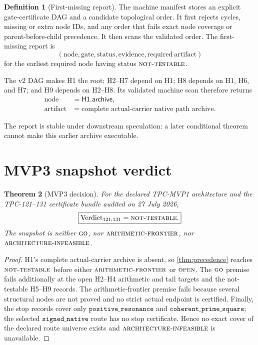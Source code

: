 \documentclass[11pt]{article}
\newtheorem{theorem}{Theorem}[section]
\theoremstyle{definition}
\newtheorem{definition}[theorem]{Definition}
\theoremstyle{remark}
\newcommand{\GO}{\textnormal{\textsc{go}}}
\newcommand{\AINF}{\textnormal{\textsc{architecture-infeasible}}}
\newcommand{\NT}{\textnormal{\textsc{not-testable}}}
\newcommand{\AF}{\textnormal{\textsc{arithmetic-frontier}}}
\newcommand{\OPEN}{\textnormal{\textsc{open}}}
\begin{document}
\begin{definition}[First-missing report]
\label{def:first}
The machine manifest stores an explicit gate-certificate DAG and a
candidate topological order.  It first rejects cycles, missing or
extra node IDs, and any order that fails exact node coverage or
parent-before-child precedence.  It then scans the validated order.
The first-missing report is
\[
 (\mathrm{node},\mathrm{gate},\mathrm{status},
  \mathrm{evidence},\mathrm{required\ artifact})
\]
for the earliest required node having status \(\NT\).
\end{definition}

The v2 DAG makes H1 the root; H2--H7 depend on H1; H8 depends on H1,
H6, and H7; and H9 depends on H2--H8.  Its validated machine scan
therefore returns
\[
\boxed{
\begin{aligned}
\mathrm{node}&=\mathsf{H1.archive},\\
\mathrm{artifact}&=\text{complete actual-carrier native path archive}.
\end{aligned}}
\]

The report is stable under downstream speculation: a later
conditional theorem cannot make this earlier archive executable.

\section{MVP3 snapshot verdict}

\begin{theorem}[MVP3 decision]
\label{thm:decision}
For the declared TPC-MVP1 architecture and the TPC-121--131
certificate bundle audited on 27 July 2026,
\[
 \boxed{\operatorname{Verdict}_{121:131}=\NT.}
\]
The snapshot is neither \(\GO\), nor \(\AF\), nor \(\AINF\).
\end{theorem}

\begin{proof}
H1's complete actual-carrier archive is absent, so
\cref{thm:precedence} reaches \(\NT\) before either
\(\AF\) or \(\OPEN\).  The \(\GO\) premise fails additionally at the
open H2--H4 arithmetic and tail targets and the not-testable
H5--H9 records.  The arithmetic-frontier premise fails because several
structural nodes are not proved and no strict actual endpoint is
certified.  Finally, the stop records cover only
\(\texttt{positive\_resonance}\) and
\(\texttt{coherent\_prime\_square}\); the selected
\(\texttt{signed\_native}\) route has no stop certificate.  Hence no
exact cover of the declared route universe exists and \(\AINF\) is
unavailable.
\end{proof}
\end{document}
